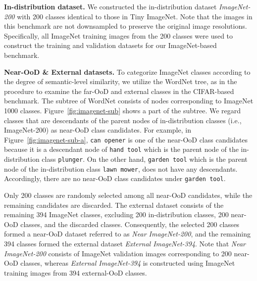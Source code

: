 \documentclass[preprint,12pt]{elsarticle}
\begin{document}
\begin{figure*}[!t]
\vskip 0.1in
    \caption{Construction process of the near-/far-OoD, and the external datasets in ImageNet-based benchmark: (a) shows how the near-OoD classes and the external classes are determined. The classes in the red box are near-OoD class candidates with the in-distribution class \texttt{plunger}, and (b) explains how the far-OoD classes are examined. The blue box contains nodes to be examined to determine if a class having the keyword \texttt{knife} should be removed from the far-OoD datasets.}
    \label{fig:imagenet-sub}
\vskip 0.1in
\end{figure*}


\textbf{In-distribution dataset.}
We constructed the in-distribution dataset \emph{ImageNet-200} with 200 classes identical to those in Tiny ImageNet. Note that the images in this benchmark are not downsampled to preserve the original image resolutions. Specifically, all ImageNet training images from the 200 classes were used to construct the training and validation datasets for our ImageNet-based benchmark.

\textbf{Near-OoD \& External datasets.}
To categorize ImageNet classes according to the degree of semantic-level similarity, we utilize the WordNet tree, as in the procedure to examine the far-OoD and external classes in the CIFAR-based benchmark. The subtree of WordNet consists of nodes corresponding to ImageNet 1000 classes. Figure~\ref{fig:imagenet-sub} shows a part of the subtree. We regard classes that are descendants of the parent nodes of in-distribution classes (i.e., ImageNet-200) as near-OoD class candidates. For example, in Figure~\ref{fig:imagenet-sub-a}, \texttt{can opener} is one of the near-OoD class candidates because it is a descendant node of \texttt{hand tool} which is the parent node of the in-distribution class \texttt{plunger}. On the other hand, \texttt{garden tool} which is the parent node of the in-distribution class \texttt{lawn mower}, does not have any descendants. Accordingly, there are no near-OoD class candidates under \texttt{garden tool}.

Only 200 classes are randomly selected among all near-OoD candidates, while the remaining candidates are discarded. The external dataset consists of the remaining 394 ImageNet classes, excluding 200 in-distribution classes, 200 near-OoD classes, and the discarded classes. Consequently, the selected 200 classes formed a near-OoD dataset referred to as \emph{Near ImageNet-200}, and the remaining 394 classes formed the external dataset \emph{External ImageNet-394}. Note that \emph{Near ImageNet-200} consists of ImageNet validation images corresponding to 200 near-OoD classes, whereas \emph{External ImageNet-394} is constructed using ImageNet training images from 394 external-OoD classes.
\end{document}
